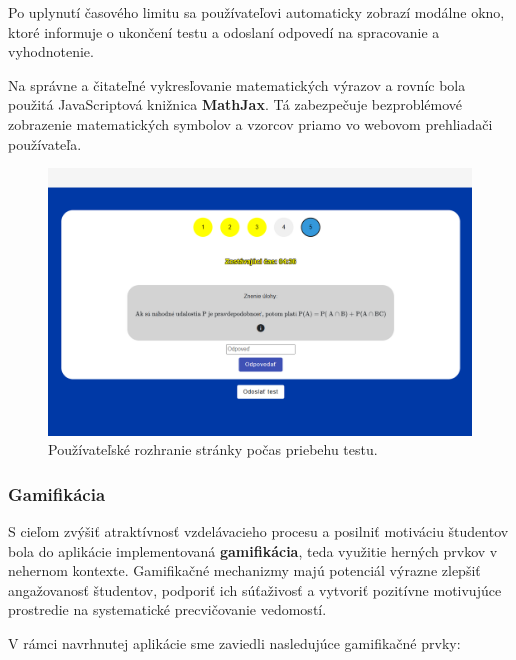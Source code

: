 Po uplynutí časového limitu sa používateľovi automaticky zobrazí modálne okno, ktoré informuje o ukončení testu a odoslaní odpovedí na spracovanie a vyhodnotenie.

Na správne a čitateľné vykresľovanie matematických výrazov a rovníc bola použitá JavaScriptová knižnica \textbf{MathJax}.
 Tá zabezpečuje bezproblémové zobrazenie matematických symbolov a vzorcov priamo vo webovom prehliadači používateľa.
\begin{figure}[h!]
  \centering
  \includegraphics[width=14cm]{img/test-writing.png}
  \caption{Používateľské rozhranie stránky počas priebehu testu.}
  \label{test-writing}
\end{figure}



\subsubsection*{Gamifikácia}

S cieľom zvýšiť atraktívnosť vzdelávacieho procesu a posilniť motiváciu študentov bola do aplikácie implementovaná \textbf{gamifikácia}, teda využitie herných prvkov v nehernom kontexte. 
Gamifikačné mechanizmy majú potenciál výrazne zlepšiť angažovanosť študentov, podporiť ich súťaživosť a vytvoriť pozitívne motivujúce prostredie na systematické precvičovanie vedomostí.

V rámci navrhnutej aplikácie sme zaviedli nasledujúce gamifikačné prvky:


